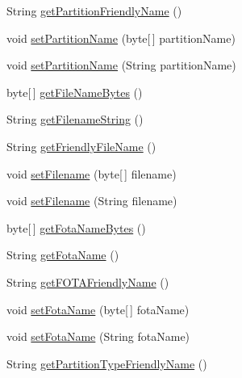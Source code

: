 \begin{DoxyCompactItemize}
\item 
String \hyperlink{class_c_a_s_u_a_l_1_1archiving_1_1libpit_1_1_pit_entry_a67d785987fd5e3db81f397e9aebfcb0d}{get\-Partition\-Friendly\-Name} ()
\item 
void \hyperlink{class_c_a_s_u_a_l_1_1archiving_1_1libpit_1_1_pit_entry_ad8aabdd2d4ed27f78caff057a86463a5}{set\-Partition\-Name} (byte\mbox{[}$\,$\mbox{]} partition\-Name)
\item 
void \hyperlink{class_c_a_s_u_a_l_1_1archiving_1_1libpit_1_1_pit_entry_ae11c9323f73814e25d10d9ef29de25ba}{set\-Partition\-Name} (String partition\-Name)
\item 
byte\mbox{[}$\,$\mbox{]} \hyperlink{class_c_a_s_u_a_l_1_1archiving_1_1libpit_1_1_pit_entry_ae4ba59c5a04f97e8e01e8fc6fd021b3c}{get\-File\-Name\-Bytes} ()
\item 
String \hyperlink{class_c_a_s_u_a_l_1_1archiving_1_1libpit_1_1_pit_entry_a2bb32a410751336bded2da8c98bcf439}{get\-Filename\-String} ()
\item 
String \hyperlink{class_c_a_s_u_a_l_1_1archiving_1_1libpit_1_1_pit_entry_aa5a661ba922a600a35c1037cc96cf460}{get\-Friendly\-File\-Name} ()
\item 
void \hyperlink{class_c_a_s_u_a_l_1_1archiving_1_1libpit_1_1_pit_entry_a020e3354fd26273533473c2bc391e846}{set\-Filename} (byte\mbox{[}$\,$\mbox{]} filename)
\item 
void \hyperlink{class_c_a_s_u_a_l_1_1archiving_1_1libpit_1_1_pit_entry_a816462a2e0544f057a118ffc4ec9f80d}{set\-Filename} (String filename)
\item 
byte\mbox{[}$\,$\mbox{]} \hyperlink{class_c_a_s_u_a_l_1_1archiving_1_1libpit_1_1_pit_entry_acd4c00ebcc7dec9ab0564563f9cdbede}{get\-Fota\-Name\-Bytes} ()
\item 
String \hyperlink{class_c_a_s_u_a_l_1_1archiving_1_1libpit_1_1_pit_entry_abd622d9204bd1e46db2b205b016a2726}{get\-Fota\-Name} ()
\item 
String \hyperlink{class_c_a_s_u_a_l_1_1archiving_1_1libpit_1_1_pit_entry_ad5fe07455a5e697fb7a22eb4de662c11}{get\-F\-O\-T\-A\-Friendly\-Name} ()
\item 
void \hyperlink{class_c_a_s_u_a_l_1_1archiving_1_1libpit_1_1_pit_entry_a0fc527ed85e5240bc005c91216ea39bb}{set\-Fota\-Name} (byte\mbox{[}$\,$\mbox{]} fota\-Name)
\item 
void \hyperlink{class_c_a_s_u_a_l_1_1archiving_1_1libpit_1_1_pit_entry_a2ccf03dfe67e6534bf8ffa80799aa55e}{set\-Fota\-Name} (String fota\-Name)
\item 
String \hyperlink{class_c_a_s_u_a_l_1_1archiving_1_1libpit_1_1_pit_entry_ab5b074367aa08d5f550112c9391dd83e}{get\-Partition\-Type\-Friendly\-Name} ()

\end{DoxyCompactItemize}
